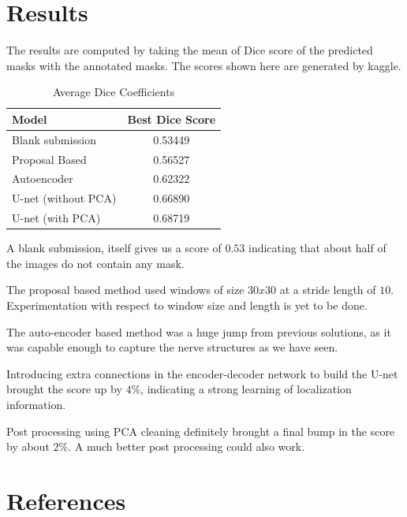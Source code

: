 \documentclass[12pt, a4paper]{article}
\begin{document}
\section{ Results}
The results are computed by taking the mean of Dice score of the predicted masks with the annotated masks. The scores shown here are generated by kaggle.
\begin{table}[H]
\caption{Average Dice Coefficients}
\label{Tabel1}
\centering
\begin{tabular}{|l | c |}
\hline
Model & Best Dice Score \\
\hline
Blank submission & 0.53449	\\
Proposal Based &  0.56527\\
Autoencoder & 0.62322	\\
U-net (without PCA) & 0.66890 \\
U-net (with PCA) & 0.68719 \\
\hline
\end{tabular}
\end{table}
A blank submission, itself gives us a score of $0.53$ indicating that about half of the images do not contain any mask. 

The proposal based method used windows of size $30x30$ at a stride length of $10$. Experimentation with respect to window size and length is yet to be done.

The auto-encoder based method was a huge jump from previous solutions, as it was capable enough to capture the nerve structures as we have seen. 

Introducing extra connections in the encoder-decoder network to build the U-net brought the score up by $4\%$, indicating a strong learning of localization information. 

Post processing using PCA cleaning definitely brought a final bump in the score by about $2\%$. A much better post processing could also work.


\renewcommand\refname{\vskip -1cm}
\section{References}


\end{document}
